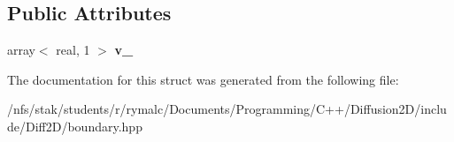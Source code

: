 \subsection*{Public Attributes}
\begin{DoxyCompactItemize}
\item 
\hypertarget{structboundary__array_a803a5adfb6f046360e560cdac2830199}{array$<$ real, 1 $>$ {\bfseries v\+\_\+}}\label{structboundary__array_a803a5adfb6f046360e560cdac2830199}

\end{DoxyCompactItemize}


The documentation for this struct was generated from the following file\+:\begin{DoxyCompactItemize}
\item 
/nfs/stak/students/r/rymalc/\+Documents/\+Programming/\+C++/\+Diffusion2\+D/include/\+Diff2\+D/boundary.\+hpp\end{DoxyCompactItemize}
